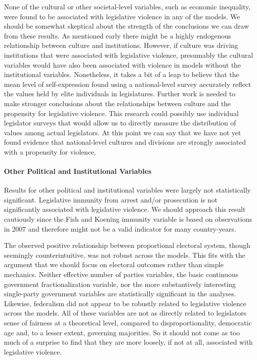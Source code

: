 \documentclass[a4paper]{article}\usepackage{graphicx, color}
\begin{document}
None of the cultural or other societal-level variables, such as economic inequality, were found to be associated with legislative violence in any of the models. We should be somewhat skeptical about the strength of the conclusions we can draw from these results. As mentioned early there might be a highly endogenous relationship between culture and institutions. However, if culture was driving institutions that were associated with legislative violence, presumably the cultural variables would have also been associated with violence in models without the institutional variables. Nonetheless, it takes a bit of a leap to believe that the mean level of self-expression found using a national-level survey accurately reflect the values held by elite individuals in legislatures. Further work is needed to make stronger conclusions about the relationships between culture and the propensity for legislative violence. This research could possibly use individual legislator surveys that would allow us to directly measure the distribution of values among actual legislators. At this point we can say that we have not yet found evidence that national-level cultures and divisions are strongly associated with a propensity for violence.

\paragraph{Other Political and Institutional Variables}
Results for other political and institutional variables were largely not statistically significant. Legislative immunity from arrest and/or prosecution is not significantly associated with legislative violence. We should approach this result cautiously since the Fish and Koening immunity variable is based on observations in 2007 and therefore might not be a valid indicator for many country-years.  

The observed positive relationship between proportional electoral system, though seemingly counterintuitive, was not robust across the models. This fits with the argument that we should focus on electoral outcomes rather than simple mechanics. Neither effective number of parties variables, the basic continuous government fractionalization variable, nor the more substantively interesting single-party government variables are statistically significant in the analyses. Likewise, federalism did not appear to be robustly related to legislative violence across the models. All of these variables are not as directly related to legislators sense of fairness at a theoretical level, compared to disproportionality, democratic age and, to a lesser extent, governing majorities. So it should not come as too much of a surprise to find that they are more loosely, if not at all, associated with legislative violence.
\end{document}
